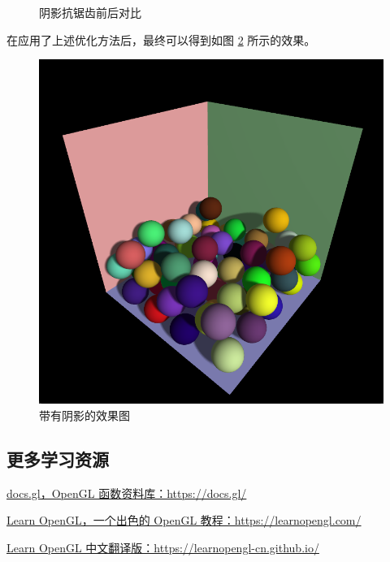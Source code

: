 \documentclass[fontset=windows]{ctexart}
\begin{document}
\begin{figure}[htbp]
    \centering
    \caption{阴影抗锯齿前后对比}
    \label{fig-gl:shadow-aa-compare}
\end{figure}

在应用了上述优化方法后，最终可以得到如图 \ref{fig-gl:lighting-with-shadow} 所示的效果。

\begin{figure}
    \centering
    \includegraphics[width=0.5\linewidth]{imgs/sec 7.1/lighting-with-shadow.png}
    \caption{带有阴影的效果图}
    \label{fig-gl:lighting-with-shadow}
\end{figure}

\subsection{更多学习资源}

\label{sec-gl:study-resources}

\href{https://docs.gl}{docs.gl，OpenGL 函数资料库：https://docs.gl/}

\href{https://learnopengl.com/}{Learn OpenGL，一个出色的 OpenGL 教程：https://learnopengl.com/}

\href{https://learnopengl-cn.github.io/}{Learn OpenGL 中文翻译版：https://learnopengl-cn.github.io/}
\end{document}
